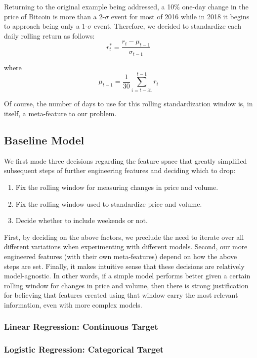 \documentclass[12pt,twoside]{article}
\begin{document}
Returning to the original example being addressed, a 10\% one-day change in the price of Bitcoin is more than a 2-$\sigma$ event for most of 2016 while in 2018 it begins to approach being only a 1-$\sigma$ event. Therefore, we decided to standardize each daily rolling return as follows:
$$r^*_t = \frac{r_t - \mu_{t-1}}{\sigma_{t-1}}$$

where 
$$\mu_{t-1}=\frac{1}{30} \sum_{i=t-31}^{t-1} r_i$$

Of course, the number of days to use for this rolling standardization window is, in itself, a meta-feature to our problem.

\subsection{Baseline Model}

We first made three decisions regarding the feature space that greatly simplified subsequent steps of further engineering features and deciding which to drop:
\begin{enumerate}
	\item Fix the rolling window for measuring changes in price and volume.
	\item Fix the rolling window used to standardize price and volume.
	\item Decide whether to include weekends or not.
\end{enumerate}

First, by deciding on the above factors, we preclude the need to iterate over all different variations when experimenting with different models. Second, our more engineered features (with their own meta-features) depend on how the above steps are set. Finally, it makes intuitive sense that these decisions are relatively model-agnostic. In other words, if a simple model performs better given a certain rolling window for changes in price and volume, then there is strong justification for believing that features created using that window carry the most relevant information, even with more complex models.

\subsubsection{Linear Regression: Continuous Target}

\subsubsection{Logistic Regression: Categorical Target}
\end{document}
